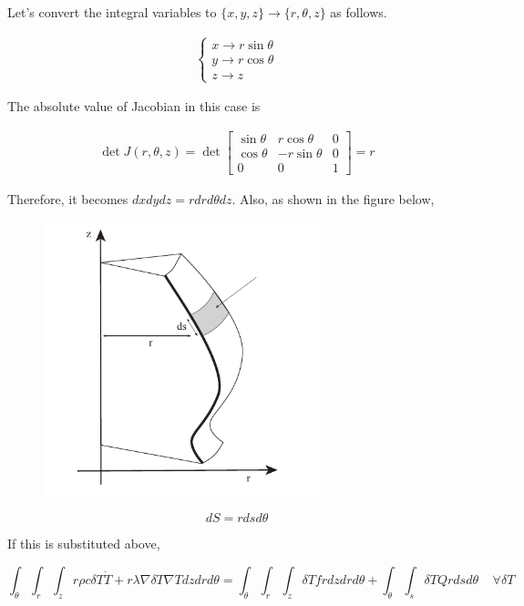 Let's convert the integral variables to $\{x,y,z\}\rightarrow \{r,\theta,z\}$ as follows.

\begin{eqnarray}
\left\{\begin{array}{l}
x\rightarrow r\sin\theta\\ 
y\rightarrow r\cos\theta\\ 
z\rightarrow z\end{array}\right.
\end{eqnarray}

The absolute value of Jacobian in this case is

\begin{eqnarray}
\det J (r,\theta,z)
=
\det \left[\begin{array}{lll}
\sin\theta & r \cos\theta & 0 \\ 
\cos\theta & -r\sin\theta & 0 \\ 
0 & 0 &  1 \end{array}\right] 
= r
\end{eqnarray}

Therefore, it becomes $dxdydz = r drd\theta dz$. Also, as shown in the figure below,

\begin{figure}[htbp!]
\center
\includegraphics[width=80mm]{images/axis_surface.pdf}
\end{figure}

\begin{equation}
dS = rdsd \theta
\end{equation}

If this is substituted above,

\begin{equation}
\int_\theta\int_r\int_z r\rho c \delta T\dot{T}  + r\lambda\nabla\delta T\nabla T dzdrd\theta = \int_\theta\int_r\int_z \delta T f rdzdrd\theta + \int_\theta \int_s  \delta T Q rdsd\theta\;\;\;\;\forall\delta T
\end{equation}

